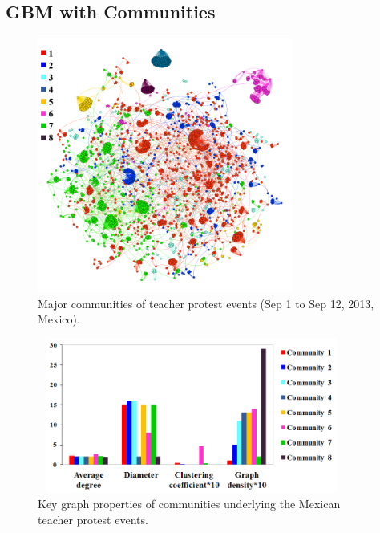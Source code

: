 \subsection{GBM with Communities}
\begin{figure}[t]
\centering
\includegraphics[width=3.3in] {figures/4_teacher_major_community.png}
\caption{Major communities of teacher protest events (Sep 1 to Sep 12, 2013,
Mexico).}
\label{fig:teacher_major_community}
\end{figure}


\begin{figure}[t]
\centering
\includegraphics[width=4in, height=2in] {figures/4teacher-community-parameters.png}
\caption{Key graph properties of communities underlying the Mexican teacher protest events.}
\label{fig:teacher_community_parameters0}
\end{figure}

